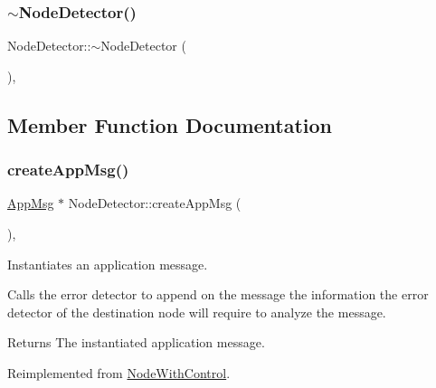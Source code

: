 \mbox{\label{class_node_detector_a3f8e6eedfce05ea8953ff1a41413ccfa}} 
\subsubsection{\texorpdfstring{$\sim$\+Node\+Detector()}{~NodeDetector()}}
{\footnotesize\ttfamily Node\+Detector\+::$\sim$\+Node\+Detector (\begin{DoxyParamCaption}{ }\end{DoxyParamCaption})\hspace{0.3cm}{\ttfamily [protected]}, {\ttfamily [virtual]}}



\subsection{Member Function Documentation}
\mbox{\label{class_node_detector_a7100349647350ad5e3aeb1ed4669c723}} 
\subsubsection{\texorpdfstring{create\+App\+Msg()}{createAppMsg()}}
{\footnotesize\ttfamily \hyperlink{class_app_msg}{App\+Msg} $\ast$ Node\+Detector\+::create\+App\+Msg (\begin{DoxyParamCaption}{ }\end{DoxyParamCaption})\hspace{0.3cm}{\ttfamily [protected]}, {\ttfamily [virtual]}}



Instantiates an application message. 

Calls the error detector to append on the message the information the error detector of the destination node will require to analyze the message. \begin{DoxyReturn}{Returns}
The instantiated application message. 
\end{DoxyReturn}


Reimplemented from \hyperlink{class_node_with_control_a7772568c2836f5f204952ebe659e0049}{Node\+With\+Control}.

